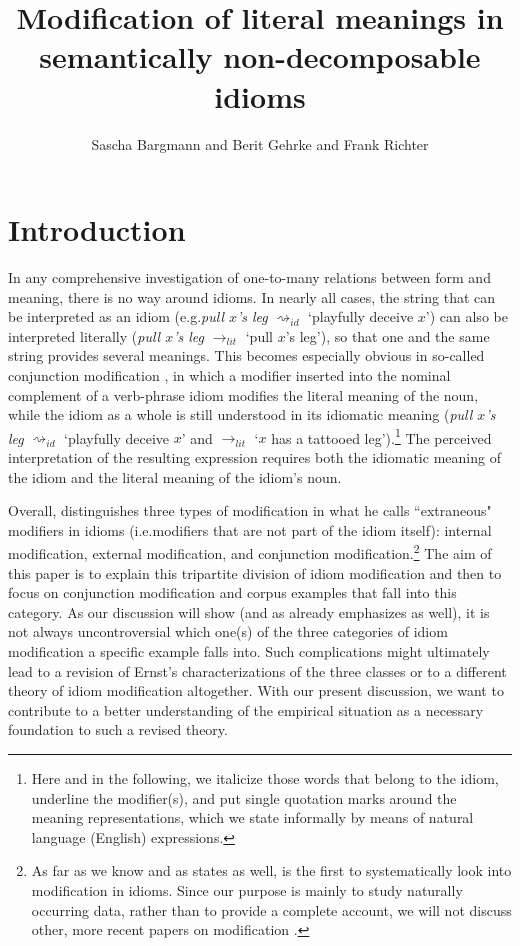 \documentclass[output=paper]{langsci/langscibook}
\title{Modification of literal meanings in semantically non-decomposable idioms}
\author{Sascha Bargmann\affiliation{Goethe-Universität Frankfurt a.M.} and Berit Gehrke\affiliation{Humboldt-Universität zu Berlin} and Frank Richter\affiliation{Goethe-Universität Frankfurt a.M.}}
\begin{document}
\maketitle

\section{Introduction}
In any comprehensive investigation of one-to-many relations between
form and meaning, there is no way around idioms. In nearly all cases,
the string that can be interpreted as an idiom (e.g.\@ \textit{pull
  $x$'s leg} $\rightsquigarrow_{id}$ `playfully deceive $x$') can also
be interpreted literally (\textit{pull $x$'s leg} $\rightarrow_{lit}$
`pull $x$'s leg'), so that one and the same string provides several
meanings. This becomes especially obvious in so-called conjunction
modification \citep{ernst81}, in which a modifier inserted into the
nominal complement of a verb-phrase idiom modifies the literal meaning
of the noun, while the idiom as a whole is still understood in its
idiomatic meaning (\textit{pull $x$'s} \underline{}
\textit{leg} $\rightsquigarrow_{id}$ `playfully deceive $x$' and
$\rightarrow_{lit}$ `$x$ has a tattooed leg').\footnote{Here and in
  the following, we italicize those words that belong to the idiom,
  underline the modifier(s), and put single quotation marks around the
  meaning representations, which we state informally by means of
  natural language (English) expressions.}
The perceived interpretation of the resulting expression requires both the idiomatic meaning of the idiom and the literal meaning of the idiom's noun.

Overall, \citet{ernst81} distinguishes three types of modification in what he calls ``extraneous" modifiers in idioms (i.e.\@ modifiers that are not part of the idiom itself): internal modification, external modification, and conjunction modification.\footnote{As far as we know and as \citet[83]{stathi07} states as well, \citet{ernst81} is the first to systematically look into modification in idioms. Since our purpose is mainly to study naturally occurring data, rather than to provide a complete account, we will not discuss other, more recent papers on modification \citep[see, for instance,][]{stathi07, cserep10, mcclure11, sailer17}.}
The aim of this paper is to explain this tripartite division of idiom modification and then to focus on conjunction modification and corpus examples that fall into this category. As our discussion will show (and as \citealt{ernst81} already emphasizes as well), it is not always uncontroversial %
which one(s) of the three categories of idiom modification a specific example falls into. Such complications might ultimately lead to a revision of Ernst's characterizations of the three classes or to a different theory of idiom modification altogether. With our present discussion, we want to contribute to a better understanding of the empirical situation as a necessary foundation to such a revised theory.
\end{document}

